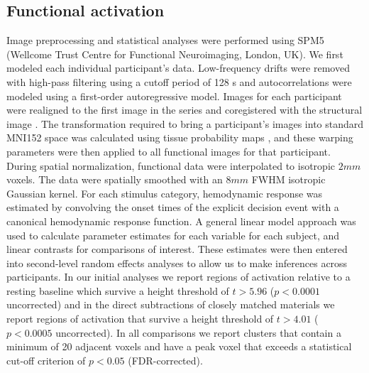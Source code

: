 \documentclass[final,authoryear,5p,times,twocolumn]{elsarticle}
\begin{document}
\subsection{Functional activation}
Image preprocessing and statistical analyses were performed using SPM5 (Wellcome Trust Centre for Functional Neuroimaging, London, UK).  We first modeled each individual participant’s data.  Low-frequency drifts were removed with high-pass filtering using a cutoff period of 128 s and autocorrelations were modeled using a first-order autoregressive model.  Images for each participant were realigned to the first image in the series \citep{Friston1995} and coregistered with the structural image \citep{Ashburner1997}.  The transformation required to bring a participant’s images into standard MNI152 space was calculated using tissue probability maps \citep{Ashburner1997}, and these warping parameters were then applied to all functional images for that participant.  During spatial normalization, functional data were interpolated to isotropic $2 mm$ voxels.  The data were spatially smoothed with an $8 mm$ FWHM isotropic Gaussian kernel.
For each stimulus category, hemodynamic response was estimated by convolving the onset times of the explicit decision event with a canonical hemodynamic response function.  A general linear model approach was used to calculate parameter estimates for each variable for each subject, and linear contrasts for comparisons of interest.  These estimates were then entered into second-level random effects analyses to allow us to make inferences across participants.  In our initial analyses we report regions of activation relative to a resting baseline which survive a height threshold of $t>5.96$ ($p<0.0001$ uncorrected) and in the direct subtractions of closely matched materials we report regions of activation that survive a height threshold of $t>4.01$ ($p<0.0005$ uncorrected).  In all comparisons we report clusters that contain a minimum of 20 adjacent voxels and have a peak voxel that exceeds a statistical cut-off criterion of $p<0.05$ (FDR-corrected).
\end{document}
